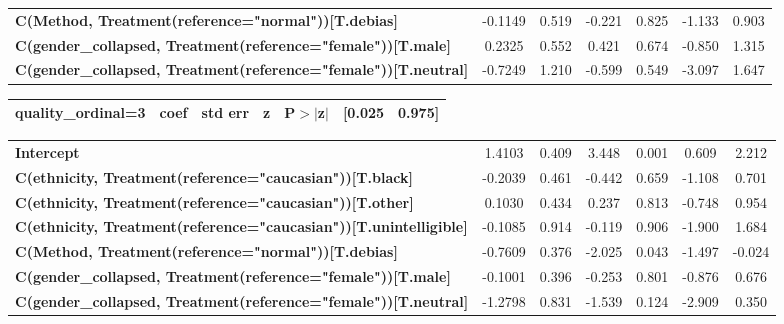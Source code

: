 \begin{center}
\begin{tabular}{lcccccc}
\textbf{C(Method, Treatment(reference="normal"))[T.debias]}               &      -0.1149  &        0.519     &    -0.221  &         0.825        &       -1.133    &        0.903     \\
\textbf{C(gender\_collapsed, Treatment(reference="female"))[T.male]}      &       0.2325  &        0.552     &     0.421  &         0.674        &       -0.850    &        1.315     \\
\textbf{C(gender\_collapsed, Treatment(reference="female"))[T.neutral]}   &      -0.7249  &        1.210     &    -0.599  &         0.549        &       -3.097    &        1.647     \\
\bottomrule
\end{tabular}
\begin{tabular}{ccccccc}
                       \textbf{quality\_ordinal=3}                        & \textbf{coef} & \textbf{std err} & \textbf{z} & \textbf{P$> |$z$|$} & \textbf{[0.025} & \textbf{0.975]}  \\
\midrule
\bottomrule
\end{tabular}
\begin{tabular}{lcccccc}
\textbf{Intercept}                                                        &       1.4103  &        0.409     &     3.448  &         0.001        &        0.609    &        2.212     \\
\textbf{C(ethnicity, Treatment(reference="caucasian"))[T.black]}          &      -0.2039  &        0.461     &    -0.442  &         0.659        &       -1.108    &        0.701     \\
\textbf{C(ethnicity, Treatment(reference="caucasian"))[T.other]}          &       0.1030  &        0.434     &     0.237  &         0.813        &       -0.748    &        0.954     \\
\textbf{C(ethnicity, Treatment(reference="caucasian"))[T.unintelligible]} &      -0.1085  &        0.914     &    -0.119  &         0.906        &       -1.900    &        1.684     \\
\textbf{C(Method, Treatment(reference="normal"))[T.debias]}               &      -0.7609  &        0.376     &    -2.025  &         0.043        &       -1.497    &       -0.024     \\
\textbf{C(gender\_collapsed, Treatment(reference="female"))[T.male]}      &      -0.1001  &        0.396     &    -0.253  &         0.801        &       -0.876    &        0.676     \\
\textbf{C(gender\_collapsed, Treatment(reference="female"))[T.neutral]}   &      -1.2798  &        0.831     &    -1.539  &         0.124        &       -2.909    &        0.350     \\

\end{tabular}
\end{center}
